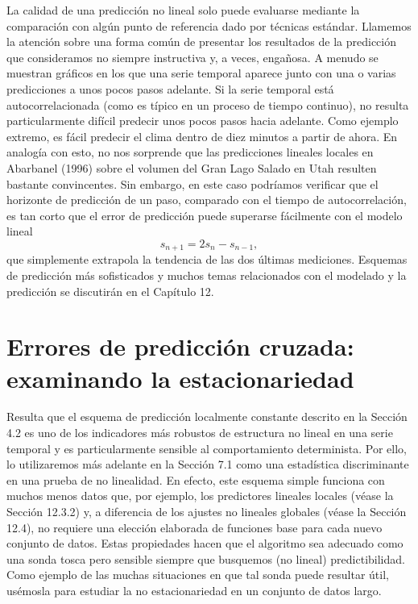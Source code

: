 \documentclass[10pt,a4paper]{book}
\begin{document}
La calidad de una predicción no lineal solo puede evaluarse mediante la comparación con algún punto de referencia dado por técnicas estándar. Llamemos la atención sobre una forma común de presentar los resultados de la predicción que consideramos no siempre instructiva y, a veces, engañosa. A menudo se muestran gráficos en los que una serie temporal aparece junto con una o varias predicciones a unos pocos pasos adelante. Si la serie temporal está autocorrelacionada (como es típico en un proceso de tiempo continuo), no resulta particularmente difícil predecir unos pocos pasos hacia adelante. Como ejemplo extremo, es fácil predecir el clima dentro de diez minutos a partir de ahora. En analogía con esto, no nos sorprende que las predicciones lineales locales en Abarbanel (1996) sobre el volumen del Gran Lago Salado en Utah resulten bastante convincentes. Sin embargo, en este caso podríamos verificar que el horizonte de predicción de un paso, comparado con el tiempo de autocorrelación, es tan corto que el error de predicción puede superarse fácilmente con el modelo lineal 
\[
s_{n+1} = 2s_n - s_{n-1},
\] 
que simplemente extrapola la tendencia de las dos últimas mediciones. Esquemas de predicción más sofisticados y muchos temas relacionados con el modelado y la predicción se discutirán en el Capítulo 12.

\newpage

\section{Errores de predicción cruzada: examinando la estacionariedad}

Resulta que el esquema de predicción localmente constante descrito en la Sección 4.2 es uno de los indicadores más robustos de estructura no lineal en una serie temporal y es particularmente sensible al comportamiento determinista. Por ello, lo utilizaremos más adelante en la Sección 7.1 como una estadística discriminante en una prueba de no linealidad. En efecto, este esquema simple funciona con muchos menos datos que, por ejemplo, los predictores lineales locales (véase la Sección 12.3.2) y, a diferencia de los ajustes no lineales globales (véase la Sección 12.4), no requiere una elección elaborada de funciones base para cada nuevo conjunto de datos. Estas propiedades hacen que el algoritmo sea adecuado como una sonda tosca pero sensible siempre que busquemos (no lineal) predictibilidad. Como ejemplo de las muchas situaciones en que tal sonda puede resultar útil, usémosla para estudiar la no estacionariedad en un conjunto de datos largo.
\end{document}
